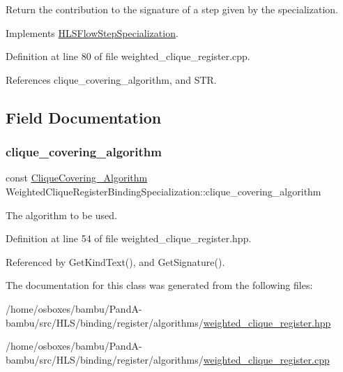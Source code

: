 Return the contribution to the signature of a step given by the specialization. 



Implements \hyperlink{classHLSFlowStepSpecialization_ae8c6ce8a3495c93e8a8edc01d8727023}{H\+L\+S\+Flow\+Step\+Specialization}.



Definition at line 80 of file weighted\+\_\+clique\+\_\+register.\+cpp.



References clique\+\_\+covering\+\_\+algorithm, and S\+TR.



\subsection{Field Documentation}
\mbox{\label{classWeightedCliqueRegisterBindingSpecialization_a77001a728b4e35958d4e92925ab2fe01}} 
\subsubsection{\texorpdfstring{clique\+\_\+covering\+\_\+algorithm}{clique\_covering\_algorithm}}
{\footnotesize\ttfamily const \hyperlink{clique__covering_8hpp_acc23ade19dac4d6935b7792353e207d9}{Clique\+Covering\+\_\+\+Algorithm} Weighted\+Clique\+Register\+Binding\+Specialization\+::clique\+\_\+covering\+\_\+algorithm}



The algorithm to be used. 



Definition at line 54 of file weighted\+\_\+clique\+\_\+register.\+hpp.



Referenced by Get\+Kind\+Text(), and Get\+Signature().



The documentation for this class was generated from the following files\+:\begin{DoxyCompactItemize}
\item 
/home/osboxes/bambu/\+Pand\+A-\/bambu/src/\+H\+L\+S/binding/register/algorithms/\hyperlink{weighted__clique__register_8hpp}{weighted\+\_\+clique\+\_\+register.\+hpp}\item 
/home/osboxes/bambu/\+Pand\+A-\/bambu/src/\+H\+L\+S/binding/register/algorithms/\hyperlink{weighted__clique__register_8cpp}{weighted\+\_\+clique\+\_\+register.\+cpp}\end{DoxyCompactItemize}

